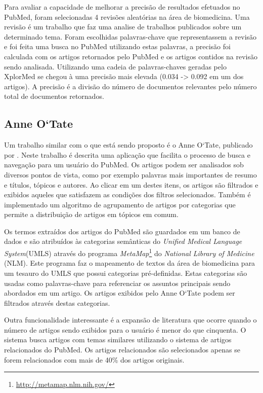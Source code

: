 Para avaliar a capacidade de melhorar a precisão de resultados efetuados no PubMed, foram selecionadas 4 revisões aleatórias na área de biomedicina. Uma revisão é um trabalho que faz uma analise de trabalhos publicados sobre um determinado tema. Foram escolhidas palavras-chave que representassem a revisão e foi feita uma busca no PubMed utilizando estas palavras, a precisão foi calculada com os artigos retornados pelo PubMed e os artigos contidos na revisão sendo analisada. Utilizando uma cadeia de palavras-chaves geradas pelo XplorMed se chegou à uma precisão mais elevada (0.034 -> 0.092 em um dos artigos). A precisão é a divisão do número de documentos relevantes pelo número total de documentos retornados.

\subsection{Anne O`Tate}
Um trabalho similar com o que está sendo proposto é o Anne O`Tate, publicado por \cite{Smalheiser2008}. Neste trabalho é descrita uma aplicação que facilita o processo de busca e navegação para um usuário do PubMed. Os artigos podem ser analisados sob diversos pontos de vista, como por exemplo palavras mais importantes de resumo e títulos, tópicos e autores. Ao clicar em um destes itens, os artigos são filtrados e exibidos aqueles que satisfazem as condições dos filtros selecionados. Também é implementado um algoritmo de agrupamento de artigos por categorias que permite a distribuição de artigos em tópicos em comum.

Os termos extraídos dos artigos do PubMed são guardados em um banco de dados e são atribuídos às categorias semânticas do \emph{Unified Medical Language System}(UMLS) através do programa \emph{MetaMap}\footnote{\href{http://metamap.nlm.nih.gov/}{http://metamap.nlm.nih.gov/}} do \emph{National Library of Medicine} (NLM). Este programa faz o mapeamento de textos da área de biomedicina para um tesauro do UMLS que  possui categorias pré-definidas. Estas categorias são usadas como palavras-chave para referenciar os assuntos principais sendo abordados em um artigo. Os artigos exibidos pelo Anne O`Tate podem ser filtrados através destas categorias.

Outra funcionalidade interessante é a expansão de literatura que ocorre quando o número de artigos sendo exibidos para o usuário é menor do que cinquenta. O sistema busca artigos com temas similares utilizando o sistema de artigos relacionados do PubMed. Os artigos relacionados são selecionados apenas se forem relacionados com mais de 40\% dos artigos originais.

